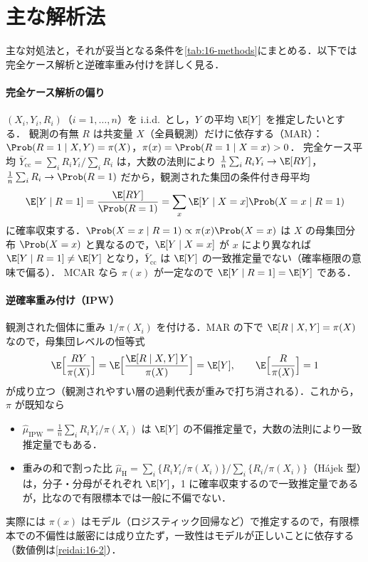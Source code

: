 \section{主な解析法}\label{sec:16-methods}
\Hissu
主な対処法と，それが妥当となる条件を\cref{tab:16-methods}にまとめる．以下では完全ケース解析と逆確率重み付けを詳しく見る．
\paragraph{完全ケース解析の偏り}
$(X_i,Y_i,R_i)$（$i=1,\dots,n$）を i.i.d.\ とし，$Y$ の平均 $\E[Y]$ を推定したいとする．
観測の有無 $R$ は共変量 $X$（全員観測）だけに依存する（MAR）：$\Prob(R=1\mid X,Y)=\pi(X)$，$\pi(x)=\Prob(R=1\mid X=x)>0$．
完全ケース平均 $\bar Y_{\mathrm{cc}}=\sum_iR_iY_i\big/\sum_iR_i$ は，大数の法則により
$\frac1n\sum_iR_iY_i\to\E[RY]$，$\frac1n\sum_iR_i\to\Prob(R=1)$ だから，観測された集団の条件付き母平均
\[
\E[Y\mid R=1]=\frac{\E[RY]}{\Prob(R=1)}=\sum_x\E[Y\mid X=x]\Prob(X=x\mid R=1)
\]
に確率収束する．$\Prob(X=x\mid R=1)\propto\pi(x)\Prob(X=x)$ は $X$ の母集団分布 $\Prob(X=x)$ と異なるので，$\E[Y\mid X=x]$ が $x$ により異なれば
$\E[Y\mid R=1]\ne\E[Y]$ となり，$\bar Y_{\mathrm{cc}}$ は $\E[Y]$ の一致推定量でない（確率極限の意味で偏る）．
MCAR なら $\pi(x)$ が一定なので $\E[Y\mid R=1]=\E[Y]$ である．
\paragraph{逆確率重み付け（IPW）}
観測された個体に重み $1/\pi(X_i)$ を付ける．MAR の下で $\E[R\mid X,Y]=\pi(X)$ なので，母集団レベルの恒等式
\[
\E\Bigl[\frac{RY}{\pi(X)}\Bigr]=\E\Bigl[\frac{\E[R\mid X,Y]\,Y}{\pi(X)}\Bigr]=\E[Y],\qquad \E\Bigl[\frac{R}{\pi(X)}\Bigr]=1
\]
が成り立つ（観測されやすい層の過剰代表が重みで打ち消される）．これから，$\pi$ が既知なら
\begin{itemize}
\item $\hat\mu_{\mathrm{IPW}}=\frac1n\sum_iR_iY_i/\pi(X_i)$ は $\E[Y]$ の不偏推定量で，大数の法則により一致推定量でもある．
\item 重みの和で割った比 $\hat\mu_{\mathrm{H}}=\sum_i\{R_iY_i/\pi(X_i)\}\big/\sum_i\{R_i/\pi(X_i)\}$（Hájek 型）は，分子・分母がそれぞれ $\E[Y]$，1 に確率収束するので一致推定量であるが，比なので有限標本では一般に不偏でない．
\end{itemize}
実際には $\pi(x)$ はモデル（ロジスティック回帰など）で推定するので，有限標本での不偏性は厳密には成り立たず，一致性はモデルが正しいことに依存する（数値例は\cref{reidai:16-2}）．

